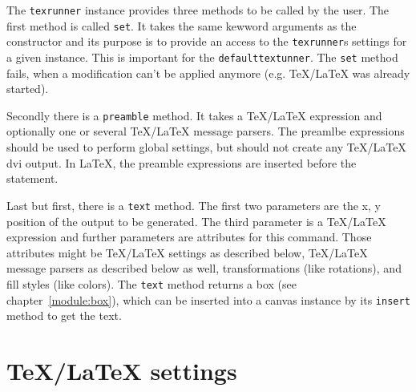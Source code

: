 \medskip
The \verb|texrunner| instance provides three methods to be called by
the user. The first method is called \verb|set|. It takes the same
kewword arguments as the constructor and its purpose is to provide an
access to the \verb|texrunner|s settings for a given instance. This is
important for the \verb|defaulttextunner|. The \verb|set| method
fails, when a modification can't be applied anymore (e.g.
\TeX/\LaTeX{} was already started).

Secondly there is a \verb|preamble| method. It takes a \TeX/\LaTeX{}
expression and optionally one or several \TeX/\LaTeX{} message
parsers. The preamlbe expressions should be used to perform global
settings, but should not create any \TeX/\LaTeX{} dvi output. In
\LaTeX, the preamble expressions are inserted before the
\verb|| statement.

Last but first, there is a \verb|text| method. The first two
parameters are the x, y position of the output to be generated. The
third parameter is a \TeX/\LaTeX{} expression and further parameters
are attributes for this command. Those attributes might be
\TeX/\LaTeX{} settings as described below, \TeX/\LaTeX{} message
parsers as described below as well, \PyX{} transformations (like
rotations), and \PyX{} fill styles (like colors). The \verb|text|
method returns a box (see chapter~\ref{module:box}), which can be inserted
into a canvas instance by its \verb|insert| method to get the text.

\section{\TeX/\LaTeX{} settings}

